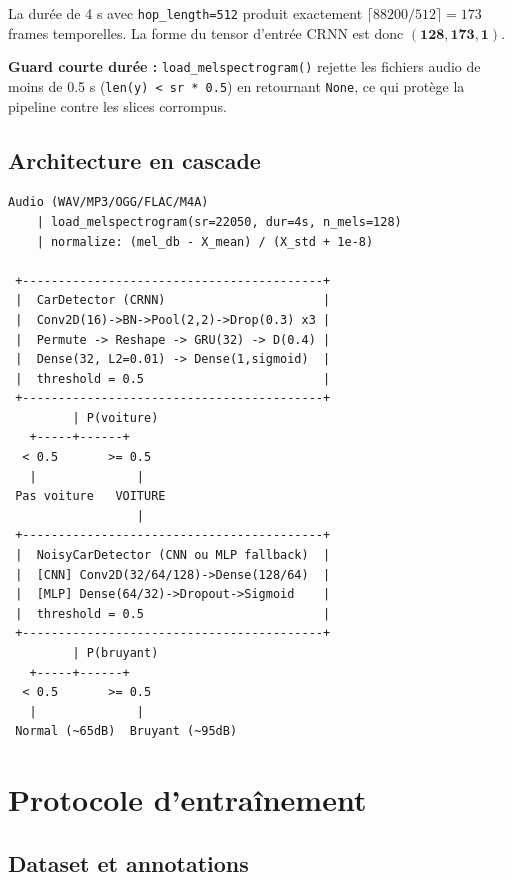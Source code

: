 \documentclass[11pt,a4paper]{article}
\newcommand{\file}[1]{\texttt{\small #1}}
\newcommand{\param}[1]{\texttt{#1}}
\begin{document}
\noindent La durée de 4 s avec \param{hop\_length=512} produit exactement $\lceil 88200/512 \rceil = 173$ frames temporelles.
La forme du tensor d'entrée CRNN est donc $\mathbf{(128, 173, 1)}$.

\begin{infobox}
\textbf{Guard courte durée :} \file{load\_melspectrogram()} rejette les fichiers audio
de moins de 0.5 s (\param{len(y) < sr * 0.5}) en retournant \param{None},
ce qui protège la pipeline contre les slices corrompus.
\end{infobox}

\subsection{Architecture en cascade}

\begin{lstlisting}[language={}, numbers=none, backgroundcolor=\color{codebg}, basicstyle=\ttfamily\footnotesize\color{codetext}]
Audio (WAV/MP3/OGG/FLAC/M4A)
    | load_melspectrogram(sr=22050, dur=4s, n_mels=128)
    | normalize: (mel_db - X_mean) / (X_std + 1e-8)

 +------------------------------------------+
 |  CarDetector (CRNN)                      |
 |  Conv2D(16)->BN->Pool(2,2)->Drop(0.3) x3 |
 |  Permute -> Reshape -> GRU(32) -> D(0.4) |
 |  Dense(32, L2=0.01) -> Dense(1,sigmoid)  |
 |  threshold = 0.5                         |
 +------------------------------------------+
         | P(voiture)
   +-----+------+
  < 0.5       >= 0.5
   |              |
 Pas voiture   VOITURE
                  |
 +------------------------------------------+
 |  NoisyCarDetector (CNN ou MLP fallback)  |
 |  [CNN] Conv2D(32/64/128)->Dense(128/64)  |
 |  [MLP] Dense(64/32)->Dropout->Sigmoid    |
 |  threshold = 0.5                         |
 +------------------------------------------+
         | P(bruyant)
   +-----+------+
  < 0.5       >= 0.5
   |              |
 Normal (~65dB)  Bruyant (~95dB)
\end{lstlisting}

\section{Protocole d'entraînement}

\subsection{Dataset et annotations}
\end{document}
